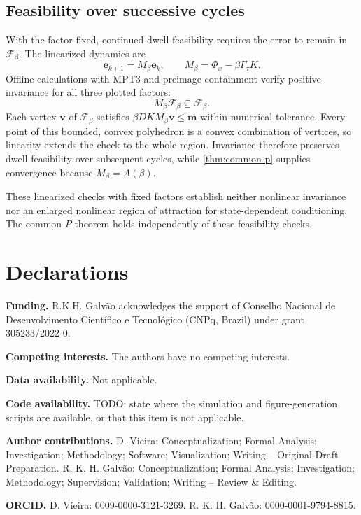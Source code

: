 \documentclass[pdflatex,iicol,sn-mathphys-ay]{sn-jnl}
\newcommand{\vect}[1]{\bm{#1}}
\begin{document}
\begin{appendices}
\subsection{Feasibility over successive cycles}

With the factor fixed, continued dwell feasibility requires the error to remain in $\mathcal F_\beta$. The linearized dynamics are
\begin{equation}
    \vect{e}_{k+1}=M_\beta\vect{e}_k,\qquad
    M_\beta=\Phi_x-\beta\Gamma_\tau K.
    \label{eq:fixed-beta-dynamics}
\end{equation}
Offline calculations with MPT3 \citep{herceg2013mpt3} and preimage containment \citep{gilbert1991maximal} verify positive invariance for all three plotted factors:
\begin{equation}
    M_\beta\mathcal F_\beta\subseteq\mathcal F_\beta.
    \label{eq:fixed-beta-invariance}
\end{equation}
Each vertex $\vect{v}$ of $\mathcal F_\beta$ satisfies $\beta DK M_\beta\vect{v}\le\vect{m}$ within numerical tolerance. Every point of this bounded, convex polyhedron is a convex combination of vertices, so linearity extends the check to the whole region. Invariance therefore preserves dwell feasibility over subsequent cycles, while \cref{thm:common-p} supplies convergence because $M_\beta=A(\beta)$.

These linearized checks with fixed factors establish neither nonlinear invariance nor an enlarged nonlinear region of attraction for state-dependent conditioning. The common-$P$ theorem holds independently of these feasibility checks.
\FloatBarrier
\end{appendices}

\section*{Declarations}
\textbf{Funding.} R.K.H. Galvão acknowledges the support of Conselho Nacional de Desenvolvimento Científico e Tecnológico (CNPq, Brazil) under grant 305233/2022-0.

\textbf{Competing interests.} The authors have no competing interests.

\textbf{Data availability.} Not applicable.

\textbf{Code availability.} TODO: state where the simulation and figure-generation scripts are available, or that this item is not applicable.

\textbf{Author contributions.} D. Vieira: Conceptualization; Formal Analysis; Investigation; Methodology; Software; Visualization; Writing – Original Draft Preparation. R. K. H. Galvão: Conceptualization; Formal Analysis; Investigation; Methodology; Supervision; Validation; Writing – Review \& Editing.

\textbf{ORCID.} D. Vieira: 0009-0000-3121-3269. R. K. H. Galvão: 0000-0001-9794-8815.


\end{document}
